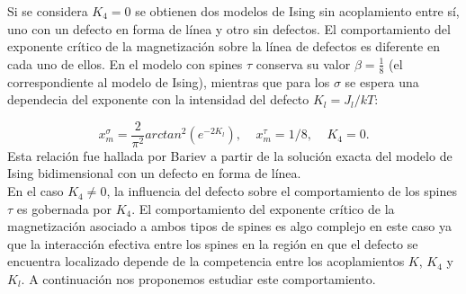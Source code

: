 Si se considera $K_{4}=0$ se obtienen dos modelos de Ising sin acoplamiento entre sí, uno con un defecto en forma de línea y otro sin defectos. El comportamiento
 del exponente crítico de la magnetización sobre la línea de defectos es diferente en cada uno de ellos. En el modelo con spines $\tau$ conserva su valor
 $\beta=\frac{1}{8}$ (el correspondiente al modelo de Ising), mientras que para los $\sigma$ se espera una dependecia del exponente con la intensidad del defecto $K_{l}=J_{l}/kT$:

\begin{equation}
	\label{eq:exp_crit_e0}
	x_{m}^{\sigma} = \frac{2}{\pi^{2}}arctan^{2}(e^{-2K_{l}}) , \; \; \; \; x_{m}^{\tau}=1/8, \; \; \; \; K_{4}=0.
\end{equation}
Esta relación fue hallada por Bariev \cite{AT_bariev_line} a partir de la solución exacta del modelo de Ising bidimensional con un defecto en forma de línea.\\

En el caso $K_{4}\neq 0$, la influencia del defecto sobre el comportamiento de los spines $\tau$ es gobernada por $K_{4}$. El comportamiento del
 exponente crítico de la magnetización asociado a ambos tipos de spines es algo complejo en este caso ya que la interacción efectiva entre los spines en la
 región en que el defecto se encuentra localizado depende de la competencia entre los acoplamientos $K$, $K_{4}$ y $K_{l}$. A continuación nos proponemos estudiar este
 comportamiento.\\



